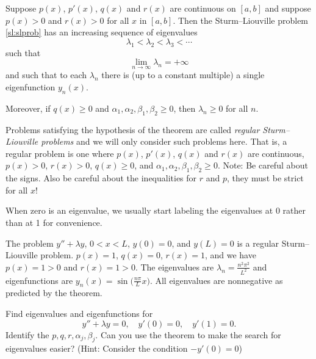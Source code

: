 \begin{theorem} \label{sl:slregthm}
Suppose $p(x)$, $p'(x)$, $q(x)$ and $r(x)$ are continuous on $[a,b]$
and suppose $p(x) > 0$ and $r(x) > 0$ for all $x$ in $[a,b]$.
Then the Sturm--Liouville problem \eqref{sl:slprob}
has an increasing sequence of eigenvalues
\begin{equation*}
\lambda_1 < \lambda_2 < \lambda_3 < \cdots 
\end{equation*}
such that
\begin{equation*}
\lim_{n \to \infty} \lambda_n = +\infty
\end{equation*}
and such that to each $\lambda_n$ there is (up to a constant multiple)
a single eigenfunction $y_n(x)$. 

Moreover, if $q(x) \geq 0$ and $\alpha_1, \alpha_2, \beta_1, \beta_2 \geq 0$,
then $\lambda_n \geq 0$ for all $n$.
\end{theorem}

Problems satisfying the hypothesis of the
theorem are called
\emph{regular Sturm--Liouville problems}%
and we will only consider such problems here.
That is, a regular problem is one where
$p(x)$, $p'(x)$, $q(x)$ and $r(x)$ are continuous, $p(x) > 0$, $r(x) > 0$,
$q(x) \geq 0$, and $\alpha_1, \alpha_2, \beta_1, \beta_2 \geq 0$.
Note: Be careful about the signs.  Also be careful about the inequalities
for $r$ and $p$, they
must be strict for all $x$!

When zero
is an eigenvalue, we usually
start labeling the eigenvalues at 0 rather than at 1 for convenience.

\begin{example}
The problem $y''+\lambda y$, $0 < x < L$, $y(0) = 0$, and $y(L) = 0$
is a regular Sturm--Liouville problem.  $p(x) = 1$, $q(x) = 0$, $r(x) = 1$,
and we have $p(x) = 1 > 0$ and $r(x) = 1 > 0$.
The eigenvalues are $\lambda_n = \frac{n^2 \pi^2}{L^2}$ and eigenfunctions
are $y_n(x) = \sin\bigl(\frac{n\pi}{L} x\bigr)$.  All eigenvalues are nonnegative as
predicted by the theorem.
\end{example}

\begin{exercise}
Find eigenvalues and eigenfunctions for
\begin{equation*}
y'' + \lambda y = 0, \quad y'(0) = 0, \quad y'(1) = 0.
\end{equation*}
Identify
the $p, q, r, \alpha_j, \beta_j$.
Can you use the theorem to make the search for eigenvalues easier?
(Hint: Consider the condition $-y'(0)=0$)
\end{exercise}

